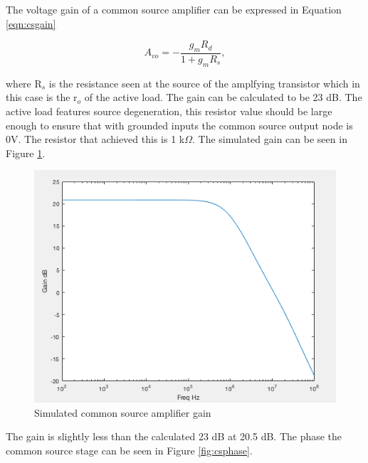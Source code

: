 The voltage gain of a common source amplifier can be expressed in Equation \ref{eqn:csgain}


\begin{equation}
A_{vo} = -\frac{g_mR_d}{1+g_mR_s},
\label{eqn:csgain}
\end{equation}

where R$_s$ is the resistance seen at the source of the amplfying transistor which in this case is the r$_o$ of the active load. The gain can be calculated to be 23 dB. The active load features source degeneration, this resistor value should be large enough to ensure that with grounded inputs the common source output node is 0V. The resistor that achieved this is 1 k$\Omega$. The simulated gain can be seen in Figure \ref{fig:gaincs}.

\begin{figure}[H]
	\begin{center}
		\includegraphics[scale=.40]{Simulations/gaincommonsource.png}
		\caption{Simulated common source amplifier gain}
		\label{fig:gaincs}
	\end{center}
\end{figure} 

The gain is slightly less than the calculated 23 dB at 20.5 dB. The phase the common source stage can be seen in Figure \ref{fig:csphase}.

